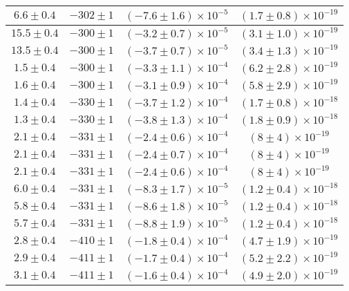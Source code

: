 \begin{longtable}[C]{|c|c|c|c|}
            \hline
            $6.6 \pm 0.4$ & $-302 \pm 1$ & $(-7.6 \pm 1.6) \times 10^{-5}$ & $(1.7 \pm 0.8) \times 10^{-19}$ \\
            \hline
            $15.5 \pm 0.4$ & $-300 \pm 1$ & $(-3.2 \pm 0.7) \times 10^{-5}$ & $(3.1 \pm 1.0) \times 10^{-19}$ \\
            \hline
            $13.5 \pm 0.4$ & $-300 \pm 1$ & $(-3.7 \pm 0.7) \times 10^{-5}$ & $(3.4 \pm 1.3) \times 10^{-19}$ \\
            \hline
            $1.5 \pm 0.4$ & $-300 \pm 1$ & $(-3.3 \pm 1.1) \times 10^{-4}$ & $(6.2 \pm 2.8) \times 10^{-19}$ \\
            \hline
            $1.6 \pm 0.4$ & $-300 \pm 1$ & $(-3.1 \pm 0.9) \times 10^{-4}$ & $(5.8 \pm 2.9) \times 10^{-19}$ \\
            \hline
            $1.4 \pm 0.4$ & $-330 \pm 1$ & $(-3.7 \pm 1.2) \times 10^{-4}$ & $(1.7 \pm 0.8) \times 10^{-18}$ \\
            \hline
            $1.3 \pm 0.4$ & $-330 \pm 1$ & $(-3.8 \pm 1.3) \times 10^{-4}$ & $(1.8 \pm 0.9) \times 10^{-18}$ \\
            \hline
            $2.1 \pm 0.4$ & $-331 \pm 1$ & $(-2.4 \pm 0.6) \times 10^{-4}$ & $(8 \pm 4) \times 10^{-19}$ \\
            \hline
            $2.1 \pm 0.4$ & $-331 \pm 1$ & $(-2.4 \pm 0.7) \times 10^{-4}$ & $(8 \pm 4) \times 10^{-19}$ \\
            \hline
            $2.1 \pm 0.4$ & $-331 \pm 1$ & $(-2.4 \pm 0.6) \times 10^{-4}$ & $(8 \pm 4) \times 10^{-19}$ \\
            \hline
            $6.0 \pm 0.4$ & $-331 \pm 1$ & $(-8.3 \pm 1.7) \times 10^{-5}$ & $(1.2 \pm 0.4) \times 10^{-18}$ \\
            \hline
            $5.8 \pm 0.4$ & $-331 \pm 1$ & $(-8.6 \pm 1.8) \times 10^{-5}$ & $(1.2 \pm 0.4) \times 10^{-18}$ \\
            \hline
            $5.7 \pm 0.4$ & $-331 \pm 1$ & $(-8.8 \pm 1.9) \times 10^{-5}$ & $(1.2 \pm 0.4) \times 10^{-18}$ \\
            \hline
            $2.8 \pm 0.4$ & $-410 \pm 1$ & $(-1.8 \pm 0.4) \times 10^{-4}$ & $(4.7 \pm 1.9) \times 10^{-19}$ \\
            \hline
            $2.9 \pm 0.4$ & $-411 \pm 1$ & $(-1.7 \pm 0.4) \times 10^{-4}$ & $(5.2 \pm 2.2) \times 10^{-19}$ \\
            \hline
            $3.1 \pm 0.4$ & $-411 \pm 1$ & $(-1.6 \pm 0.4) \times 10^{-4}$ & $(4.9 \pm 2.0) \times 10^{-19}$ \\

\end{longtable}

